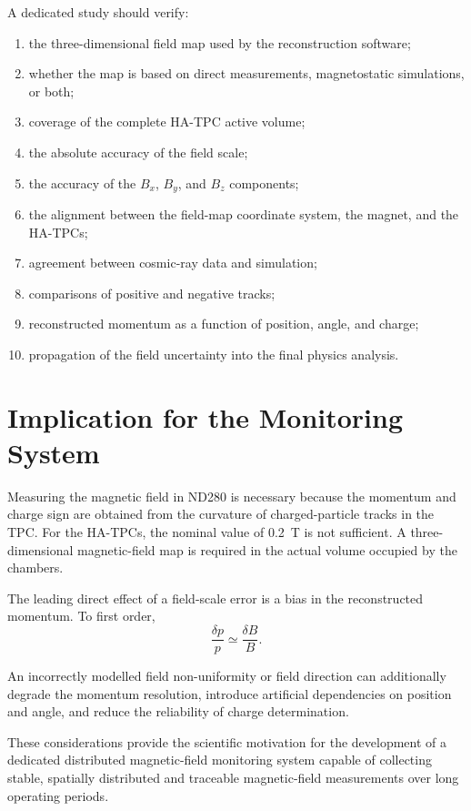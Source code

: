 A dedicated study should verify:
\begin{enumerate}[leftmargin=*]
  \item the three-dimensional field map used by the reconstruction software;
  \item whether the map is based on direct measurements, magnetostatic simulations, or both;
  \item coverage of the complete HA-TPC active volume;
  \item the absolute accuracy of the field scale;
  \item the accuracy of the $B_x$, $B_y$, and $B_z$ components;
  \item the alignment between the field-map coordinate system, the magnet, and the HA-TPCs;
  \item agreement between cosmic-ray data and simulation;
  \item comparisons of positive and negative tracks;
  \item reconstructed momentum as a function of position, angle, and charge;
  \item propagation of the field uncertainty into the final physics analysis.
\end{enumerate}

\section{Implication for the Monitoring System}

Measuring the magnetic field in ND280 is necessary because the momentum and charge sign are obtained from the curvature of charged-particle tracks in the TPC. For the HA-TPCs, the nominal value of \SI{0.2}{T} is not sufficient. A three-dimensional magnetic-field map is required in the actual volume occupied by the chambers.

The leading direct effect of a field-scale error is a bias in the reconstructed momentum. To first order,
\begin{equation}
 \frac{\delta p}{p} \simeq \frac{\delta B}{B}.
\end{equation}

An incorrectly modelled field non-uniformity or field direction can additionally degrade the momentum resolution, introduce artificial dependencies on position and angle, and reduce the reliability of charge determination.

These considerations provide the scientific motivation for the development of a dedicated distributed magnetic-field monitoring system capable of collecting stable, spatially distributed and traceable magnetic-field measurements over long operating periods.
